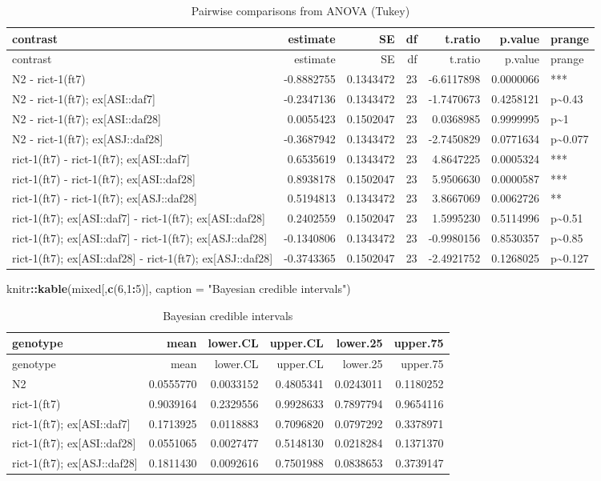 \documentclass[]{article}
\newenvironment{Shaded}{\begin{snugshade}}{\end{snugshade}}
\newcommand{\KeywordTok}[1]{\textcolor[rgb]{0.13,0.29,0.53}{\textbf{#1}}}
\newcommand{\DataTypeTok}[1]{\textcolor[rgb]{0.13,0.29,0.53}{#1}}
\newcommand{\DecValTok}[1]{\textcolor[rgb]{0.00,0.00,0.81}{#1}}
\newcommand{\StringTok}[1]{\textcolor[rgb]{0.31,0.60,0.02}{#1}}
\newcommand{\OperatorTok}[1]{\textcolor[rgb]{0.81,0.36,0.00}{\textbf{#1}}}
\newcommand{\NormalTok}[1]{#1}
\begin{document}
\begin{longtable}[]{@{}lrrrrrl@{}}
\caption{Pairwise comparisons from ANOVA (Tukey)}\tabularnewline
\toprule
contrast & estimate & SE & df & t.ratio & p.value &
prange\tabularnewline
\midrule
\endfirsthead
\toprule
contrast & estimate & SE & df & t.ratio & p.value &
prange\tabularnewline
\midrule
\endhead
N2 - rict-1(ft7) & -0.8882755 & 0.1343472 & 23 & -6.6117898 & 0.0000066
& ***\tabularnewline
N2 - rict-1(ft7); ex{[}ASI::daf7{]} & -0.2347136 & 0.1343472 & 23 &
-1.7470673 & 0.4258121 & p\textasciitilde{}0.43\tabularnewline
N2 - rict-1(ft7); ex{[}ASI::daf28{]} & 0.0055423 & 0.1502047 & 23 &
0.0368985 & 0.9999995 & p\textasciitilde{}1\tabularnewline
N2 - rict-1(ft7); ex{[}ASJ::daf28{]} & -0.3687942 & 0.1343472 & 23 &
-2.7450829 & 0.0771634 & p\textasciitilde{}0.077\tabularnewline
rict-1(ft7) - rict-1(ft7); ex{[}ASI::daf7{]} & 0.6535619 & 0.1343472 &
23 & 4.8647225 & 0.0005324 & ***\tabularnewline
rict-1(ft7) - rict-1(ft7); ex{[}ASI::daf28{]} & 0.8938178 & 0.1502047 &
23 & 5.9506630 & 0.0000587 & ***\tabularnewline
rict-1(ft7) - rict-1(ft7); ex{[}ASJ::daf28{]} & 0.5194813 & 0.1343472 &
23 & 3.8667069 & 0.0062726 & **\tabularnewline
rict-1(ft7); ex{[}ASI::daf7{]} - rict-1(ft7); ex{[}ASI::daf28{]} &
0.2402559 & 0.1502047 & 23 & 1.5995230 & 0.5114996 &
p\textasciitilde{}0.51\tabularnewline
rict-1(ft7); ex{[}ASI::daf7{]} - rict-1(ft7); ex{[}ASJ::daf28{]} &
-0.1340806 & 0.1343472 & 23 & -0.9980156 & 0.8530357 &
p\textasciitilde{}0.85\tabularnewline
rict-1(ft7); ex{[}ASI::daf28{]} - rict-1(ft7); ex{[}ASJ::daf28{]} &
-0.3743365 & 0.1502047 & 23 & -2.4921752 & 0.1268025 &
p\textasciitilde{}0.127\tabularnewline
\bottomrule
\end{longtable}

\begin{Shaded}
\begin{Highlighting}[]
\NormalTok{knitr}\OperatorTok{::}\KeywordTok{kable}\NormalTok{(mixed[,}\KeywordTok{c}\NormalTok{(}\DecValTok{6}\NormalTok{,}\DecValTok{1}\OperatorTok{:}\DecValTok{5}\NormalTok{)], }\DataTypeTok{caption =} \StringTok{"Bayesian credible intervals"}\NormalTok{)}
\end{Highlighting}
\end{Shaded}

\begin{longtable}[]{@{}lrrrrr@{}}
\caption{Bayesian credible intervals}\tabularnewline
\toprule
genotype & mean & lower.CL & upper.CL & lower.25 &
upper.75\tabularnewline
\midrule
\endfirsthead
\toprule
genotype & mean & lower.CL & upper.CL & lower.25 &
upper.75\tabularnewline
\midrule
\endhead
N2 & 0.0555770 & 0.0033152 & 0.4805341 & 0.0243011 &
0.1180252\tabularnewline
rict-1(ft7) & 0.9039164 & 0.2329556 & 0.9928633 & 0.7897794 &
0.9654116\tabularnewline
rict-1(ft7); ex{[}ASI::daf7{]} & 0.1713925 & 0.0118883 & 0.7096820 &
0.0797292 & 0.3378971\tabularnewline
rict-1(ft7); ex{[}ASI::daf28{]} & 0.0551065 & 0.0027477 & 0.5148130 &
0.0218284 & 0.1371370\tabularnewline
rict-1(ft7); ex{[}ASJ::daf28{]} & 0.1811430 & 0.0092616 & 0.7501988 &
0.0838653 & 0.3739147\tabularnewline
\bottomrule
\end{longtable}
\end{document}
